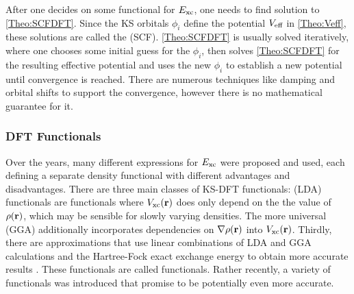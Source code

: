 \documentclass[8.5pt,twoside,twocolumn]{article}
\renewcommand\r{\bo r}
\theoremstyle{standard}
\begin{document}
After one decides on some functional for $E_{\text{xc}}$, one needs to find  solution
to \eqref{Theo:SCFDFT}. Since the KS orbitals $\phi_i$ define the potential $V_{\text{eff}}$ in
\eqref{Theo:Veff}, these solutions are called the  (SCF). 
\eqref{Theo:SCFDFT} is usually solved iteratively, where one chooses some initial guess
for the $\phi_i$, then solves \eqref{Theo:SCFDFT} for the resulting effective potential
and uses the new $\phi_i$ to establish a new potential until convergence is reached.
There are numerous techniques like damping and orbital shifts to support the
convergence, however there is no mathematical guarantee for it. 


\subsubsection{DFT Functionals}
\label{Sec:Theo:Functionals}
Over the years, many different expressions for $E_{\text{xc}}$ were proposed and used, each
defining a separate density functional with different advantages and disadvantages. There
are three main classes of KS-DFT functionals:  (LDA) functionals
are functionals where $\vxc(\r)$ does only depend on the the value of $\rho(\r)$, which may
be sensible for slowly varying densities. The more universal  (GGA) additionally incorporates dependencies on $\nabla\rho(\r)$ into $\vxc(\r)$. Thirdly,
there are approximations that use linear combinations of LDA and GGA calculations and the
Hartree-Fock exact exchange energy to obtain more accurate results \cite{Becke1993}. 
These functionals are called  functionals. Rather recently, a variety of
 functionals was introduced that promise to be potentially even more accurate.
\end{document}
